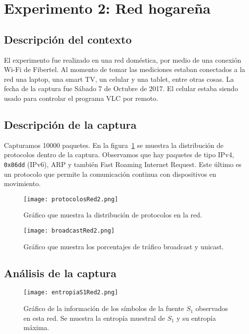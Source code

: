 \section{Experimento 2: Red hogareña}

\subsection{Descripción del contexto}

El experimento fue realizado en una red doméstica, por medio de una conexión Wi-Fi de Fibertel. Al momento de tomar las mediciones estaban conectados a la red una laptop, una smart TV, un celular y una tablet, entre otras cosas. La fecha de la captura fue Sábado 7 de Octubre de 2017. El celular estaba siendo usado para controlar el programa VLC por remoto.

\subsection{Descripción de la captura}

Capturamos 10000 paquetes. En la figura~\ref{protocolos2} se muestra la distribución de protocolos dentro de la captura. Observamos que hay paquetes de tipo IPv4, \texttt{0x86dd} (IPv6), ARP y también Fast Roaming Internet Request. Este último es un protocolo que permite la comunicación continua con dispositivos en movimiento. 

\begin{figure}[H]
\centering
\texttt{[image: protocolosRed2.png]}
\caption{Gráfico que muestra la distribución de protocolos en la red.}
\label{protocolos2}
\end{figure}

\begin{figure}[H]
\centering
\texttt{[image: broadcastRed2.png]}
\caption{Gráfico que muestra los porcentajes de tráfico broadcast y unicast.}
\label{broadcast2}
\end{figure}

\subsection{Análisis de la captura}

\begin{figure}[H]
\centering
\texttt{[image: entropiaS1Red2.png]}
\caption{Gráfico de la información de los símbolos de la fuente $S_1$ observados en esta red. Se muestra la entropía muestral de $S_1$ y su entropía máxima.}
\label{entropias1_2}
\end{figure}

